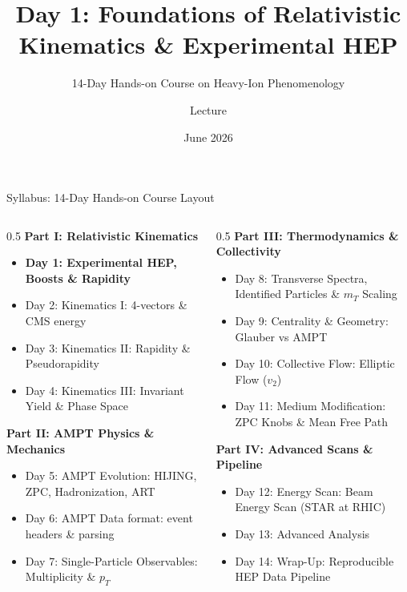 \documentclass[aspectratio=169]{beamer}
\title[AMPT Course — Day 1]{Day 1: Foundations of Relativistic Kinematics \& Experimental HEP}
\subtitle{14-Day Hands-on Course on Heavy-Ion Phenomenology}
\author[MSc-Lecture Series]{ Lecture }
\institute[HEP Group]{NIT-J,HEP-119}
\date{June 2026}
\begin{document}
\begin{frame}
    \titlepage
\end{frame}

\begin{frame}{Syllabus: 14-Day Hands-on Course Layout}
    \begin{columns}
        \begin{column}{0.5\textwidth}
            \footnotesize
            \textbf{Part I: Relativistic Kinematics}
            \begin{itemize}
                \item \textbf{Day 1: Experimental HEP, Boosts \& Rapidity}
                \item Day 2: Kinematics I: 4-vectors \& CMS energy
                \item Day 3: Kinematics II: Rapidity \& Pseudorapidity
                \item Day 4: Kinematics III: Invariant Yield \& Phase Space
            \end{itemize}
            \vspace{0.05cm}
            \textbf{Part II: AMPT Physics \& Mechanics}
            \begin{itemize}
                \item Day 5: AMPT Evolution: HIJING, ZPC, Hadronization, ART
                \item Day 6: AMPT Data format: event headers \& parsing
                \item Day 7: Single-Particle Observables: Multiplicity \& $p_T$
            \end{itemize}
        \end{column}
        \begin{column}{0.5\textwidth}
            \footnotesize
            \textbf{Part III: Thermodynamics \& Collectivity}
            \begin{itemize}
                \item Day 8: Transverse Spectra, Identified Particles \& $m_T$ Scaling
                \item Day 9: Centrality \& Geometry: Glauber vs AMPT
                \item Day 10: Collective Flow: Elliptic Flow ($v_2$)
                \item Day 11: Medium Modification: ZPC Knobs \& Mean Free Path
            \end{itemize}
            \vspace{0.1cm}
            \textbf{Part IV: Advanced Scans \& Pipeline}
            \begin{itemize}
                \item Day 12: Energy Scan: Beam Energy Scan (STAR at RHIC)
                \item Day 13: Advanced Analysis
                \item Day 14: Wrap-Up: Reproducible HEP Data Pipeline
            \end{itemize}
        \end{column}
    \end{columns}
\end{frame}
\end{document}
